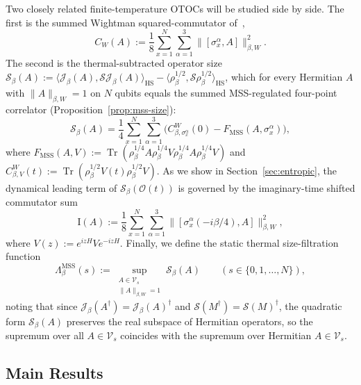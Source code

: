 \documentclass[11pt,a4paper]{article}
\numberwithin{equation}{section}
\theoremstyle{plain}
\theoremstyle{definition}
\newcommand{\HS}{\mathrm{HS}}
\newcommand{\MSS}{\mathrm{MSS}}
\newcommand{\Tr}{\operatorname{Tr}}
\begin{document}
Two closely related finite-temperature OTOCs will be studied side by side. The first is the summed Wightman squared-commutator of~\cite{Parker2019},
\begin{equation}\label{eq:intro-CW}
  C_W(A) := \frac{1}{8}\sum_{x=1}^N\sum_{\alpha=1}^3 \bigl\|[\sigma_x^\alpha, A]\bigr\|_{\beta,W}^2.
\end{equation}
The second is the thermal-subtracted operator size $\mathcal{S}_\beta(A) := \langle\mathcal{J}_\beta(A),\mathcal{S}\mathcal{J}_\beta(A)\rangle_\HS - \langle\rho_\beta^{1/2},\mathcal{S}\rho_\beta^{1/2}\rangle_\HS$, which for every Hermitian $A$ with $\|A\|_{\beta,W}=1$ on $N$ qubits equals the summed MSS-regulated four-point correlator (Proposition~\ref{prop:mss-size}):
\begin{equation}\label{eq:intro-Sbeta}
  \mathcal{S}_\beta(A) = \frac{1}{4}\sum_{x=1}^N\sum_{\alpha=1}^3 \bigl(C_{\beta,\sigma_x^\alpha}^W(0) - F_\MSS(A,\sigma_x^\alpha)\bigr),
\end{equation}
where $F_\MSS(A,V) := \Tr(\rho_\beta^{1/4}A\rho_\beta^{1/4}V\rho_\beta^{1/4}A\rho_\beta^{1/4}V)$ and $C_{\beta,V}^W(t) := \Tr(\rho_\beta^{1/2}V(t)\rho_\beta^{1/2}V)$. As we show in Section~\ref{sec:entropic}, the dynamical leading term of $\mathcal{S}_\beta(\mathcal{O}(t))$ is governed by the imaginary-time shifted commutator sum
\begin{equation}\label{eq:intro-I}
  \mathrm{I}(A) := \frac{1}{8}\sum_{x=1}^N\sum_{\alpha=1}^3 \bigl\|[\sigma_x^\alpha(-i\beta/4), A]\bigr\|_{\beta,W}^2,
\end{equation}
where $V(z) := e^{izH} V e^{-izH}$. Finally, we define the static thermal size-filtration function
\begin{equation}\label{eq:intro-Lambda}
  \Lambda_\beta^{\MSS}(s) := \sup_{\substack{A\in\mathcal{V}_s \\ \|A\|_{\beta,W}=1}} \mathcal{S}_\beta(A) \qquad (s\in\{0,1,\dots,N\}),
\end{equation}
noting that since $\mathcal{J}_\beta(A^\dagger) = \mathcal{J}_\beta(A)^\dagger$ and $\mathcal{S}(M^\dagger) = \mathcal{S}(M)^\dagger$, the quadratic form $\mathcal{S}_\beta(A)$ preserves the real subspace of Hermitian operators, so the supremum over all $A\in\mathcal{V}_s$ coincides with the supremum over Hermitian $A\in\mathcal{V}_s$.

\subsection{Main Results}\label{subsec:main-theorems}
\end{document}
